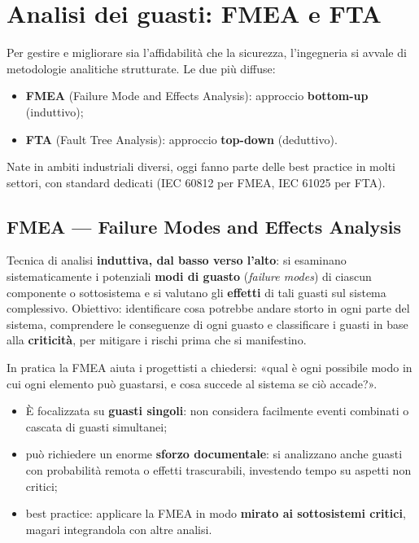 \section{Analisi dei guasti: FMEA e FTA}
Per gestire e migliorare sia l'affidabilità che la sicurezza, l'ingegneria si avvale di metodologie analitiche strutturate. Le due più diffuse:
\begin{itemize}
    \item \textbf{FMEA} (Failure Mode and Effects Analysis): approccio \textbf{bottom-up} (induttivo);
    \item \textbf{FTA} (Fault Tree Analysis): approccio \textbf{top-down} (deduttivo).
\end{itemize}
Nate in ambiti industriali diversi, oggi fanno parte delle best practice in molti settori, con standard dedicati (IEC 60812 per FMEA, IEC 61025 per FTA).

\subsection{FMEA — Failure Modes and Effects Analysis}
\begin{defn}[FMEA]
Tecnica di analisi \textbf{induttiva, dal basso verso l'alto}: si esaminano sistematicamente i potenziali \textbf{modi di guasto} (\emph{failure modes}) di ciascun componente o sottosistema e si valutano gli \textbf{effetti} di tali guasti sul sistema complessivo. Obiettivo: identificare cosa potrebbe andare storto in ogni parte del sistema, comprendere le conseguenze di ogni guasto e classificare i guasti in base alla \textbf{criticità}, per mitigare i rischi prima che si manifestino.
\end{defn}
In pratica la FMEA aiuta i progettisti a chiedersi: «qual è ogni possibile modo in cui ogni elemento può guastarsi, e cosa succede al sistema se ciò accade?».

\begin{note}
\begin{itemize}
    \item È focalizzata su \textbf{guasti singoli}: non considera facilmente eventi combinati o cascata di guasti simultanei;
    \item può richiedere un enorme \textbf{sforzo documentale}: si analizzano anche guasti con probabilità remota o effetti trascurabili, investendo tempo su aspetti non critici;
    \item best practice: applicare la FMEA in modo \textbf{mirato ai sottosistemi critici}, magari integrandola con altre analisi.
\end{itemize}
\end{note}


